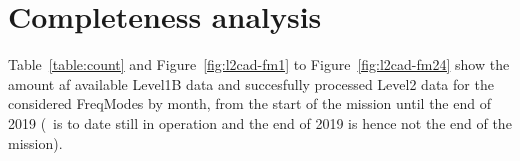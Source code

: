 \chapter{Completeness analysis}
\label{chapter:cad}


\begin{table}
\caption{\smr\ Level1B and Level2 data count by frequency mode.
Level2 data are further categorized into two classes: "All-Level2" and "Ok-Level2",
where "Ok-Level2" means that the Level2 processing produced a result with a valid
quality.
Column "succes rate - Level2" and "succes rate - Ok Level2" describes the fraction of
"Level2 count - All" over "Level1B count" and "Level2 count - ok" over "Level2 count - All".}
\label{table:count}
\end{table}


Table~\ref{table:count} and Figure~\ref{fig:l2cad-fm1} to
Figure~\ref{fig:l2cad-fm24} show the amount af available Level1B
data and succesfully processed Level2 data for the considered
FreqModes by month, from the start of the mission until the
end of 2019 (\smr\ is to date still in operation and the
end of 2019 is hence not the end of the mission).  

